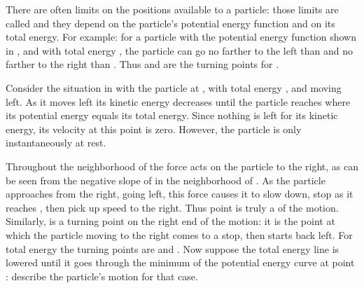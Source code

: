 {
There are often limits on the positions available to a particle: those
limits are called  and they depend on the particle's
potential energy function and on its total energy.
For example: for a particle with the potential energy function shown in
, and with total energy , the particle can go no farther to the
left than  and no farther to the right than .
Thus  and  are the turning points for .

Consider the situation in  with the particle at , with total energy
, and moving left.
As it moves left its kinetic energy decreases until the particle reaches 
where its potential energy equals its total energy.
Since nothing is left for its kinetic energy, its velocity at this point is
zero.
However, the particle is only instantaneously at rest.

Throughout the neighborhood of  the force acts on the particle to the
right, as can be seen from the negative slope of  in the neighborhood of
.
As the particle approaches  from the right, going left, this force causes
it to slow down, stop as it reaches , then pick up speed to the right.
Thus point  is truly a  of the motion.
Similarly,  is a turning point on the right end of the motion:
it is the point at which the particle moving to the right comes to a stop,
then starts back left.
For total energy  the turning points are  and .
Now suppose the total energy line is lowered until it goes through the
minimum of the potential energy curve at point : describe the particle's
motion for that case. 
}%
%
%
%
